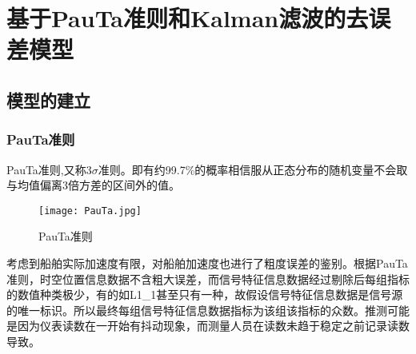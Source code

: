 \clearpage
\section{基于PauTa准则和Kalman滤波的去误差模型}
\subsection{模型的建立}
\subsubsection{PauTa准则}
PauTa准则,又称\(3\sigma\)准则。即有约99.7\%的概率相信服从正态分布的随机变量不会取与均值偏离3倍方差的区间外的值。
\begin{figure}[htbp]
	\centering
	\caption{PauTa准则}
	\texttt{[image: PauTa.jpg]}
\end{figure}
\par 考虑到船舶实际加速度有限，对船舶加速度也进行了粗度误差的鉴别。根据PauTa准则，时空位置信息数据不含粗大误差，而信号特征信息数据经过剔除后每组指标的数值种类极少，有的如L1\_1甚至只有一种，故假设信号特征信息数据是信号源的唯一标识。所以最终每组信号特征信息数据指标为该组该指标的众数。推测可能是因为仪表读数在一开始有抖动现象，而测量人员在读数未趋于稳定之前记录读数导致。
